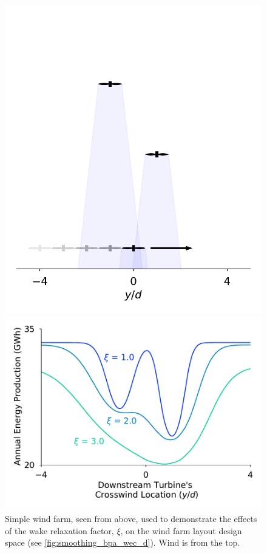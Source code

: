 \documentclass[a4paper]{jpconf}
\begin{document}
\begin{figure}[ht]
	\centering
	\begin{minipage}[t]{0.43\textwidth}
		\centering
		\includegraphics[width=\textwidth, trim={-0.5cm -0.5cm -0.5cm 3.25cm}, clip]{final_images/layouts/3turb-design-space}
		\caption{Simple wind farm, seen from above, used to demonstrate the effects of the wake relaxation factor, $\xi$, on the wind farm layout design space (see \cref{fig:smoothing_bpa_wec_d}). Wind is from the top.}
		\label{fig:smoothing_locations_wec_d}
	\end{minipage}\hspace{1pc}%
	\begin{minipage}[t]{0.52\textwidth}
		\centering
		\includegraphics[width=\textwidth]{smoothing_bpa_wec_d}

\end{minipage}
\end{figure}
\end{document}
